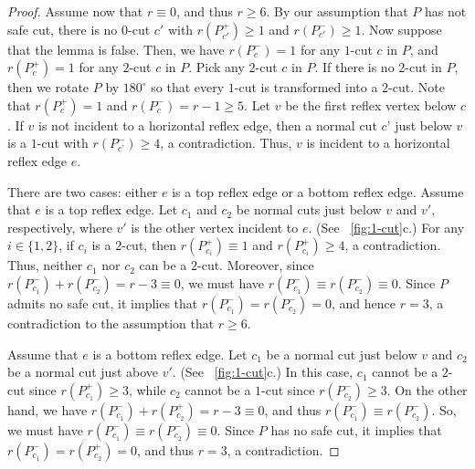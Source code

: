 \documentclass[11pt]{article}
\theoremstyle{definition}
\let\geq\geqslant
\begin{document}
\begin{proof}
Assume now that $r\equiv 0$, and thus $r \geq 6$. By our assumption that $P$ has not safe 
cut, there is no $0$-cut $c'$ with $r(P^+_{c'}) \geq 1$ and $r(P^-_{c'}) \geq 1$.
Now suppose that the lemma is false.
Then, we have $r(P^-_c) = 1$ for any $1$-cut $c$ in $P$, and
$r(P^+_c) = 1$ for any $2$-cut $c$ in $P$.
Pick any $2$-cut $c$ in $P$.
If there is no $2$-cut in $P$, then we rotate $P$ by $180^\circ$
so that every $1$-cut is transformed into a $2$-cut.
Note that $r(P^+_c) = 1$ and $r(P^-_c) = r - 1 \geq 5$.
Let $v$ be the first reflex vertex below $c$.
If $v$ is not incident to a horizontal reflex edge,
then a normal cut $c’$ just below $v$ is a $1$-cut with $r(P^-_{c’}) \geq 4$,
a contradiction.
Thus, $v$ is incident to a horizontal reflex edge $e$.

There are two cases: either $e$ is a top reflex edge or a bottom reflex edge.
Assume that $e$ is a top reflex edge.
Let $c_1$ and $c_2$ be normal cuts just below $v$ and $v'$, respectively,
where $v'$ is the other vertex incident to $e$.
(See \figurename~\ref{fig:1-cut}c.)
For any $i \in \{1, 2\}$, if $c_i$ is a $2$-cut, then $r(P^+_{c_i}) \equiv 1$
and $r(P^+_{c_i}) \geq 4$, a contradiction.
Thus, neither $c_1$ nor $c_2$ can be a $2$-cut.
Moreover, since $r(P^-_{c_1}) + r(P^-_{c_2}) = r - 3 \equiv 0$,
we must have $r(P^-_{c_1}) \equiv r(P^-_{c_2}) \equiv 0$.
Since $P$ admits no safe cut, it implies that 
$r(P^-_{c_1}) = r(P^-_{c_2}) = 0$, and hence $r = 3$, a contradiction
to the assumption that $r\geq 6$.

Assume that $e$ is a bottom reflex edge.
Let $c_1$ be a normal cut just below $v$
and $c_2$ be a normal cut just above $v'$.
(See \figurename~\ref{fig:1-cut}c.)
In this case, $c_1$ cannot be a $2$-cut since $r(P^+_{c_1}) \geq 3$,
while $c_2$ cannot be a $1$-cut since $r(P^-_{c_2}) \geq 3$.
On the other hand, we have $r(P^-_{c_1}) + r(P^+_{c_2}) = r - 3 \equiv 0$,
and thus $r(P^-_{c_1}) \equiv r(P^-_{c_2})$.
So, we must have $r(P^-_{c_1}) \equiv r(P^-_{c_2}) \equiv 0$.
Since $P$ has no safe cut, it implies that  $r(P^-_{c_1}) = r(P^+_{c_2}) = 0$,
and thus $r = 3$, a contradiction.
\end{proof}
\end{document}
